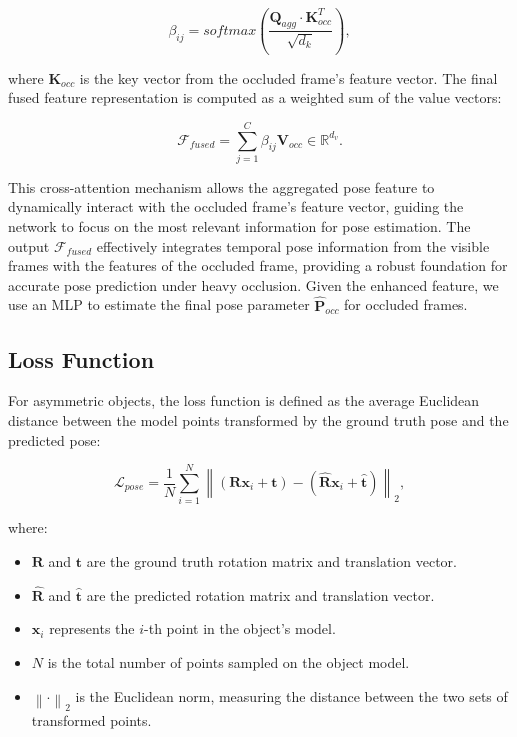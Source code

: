 \begin{equation}
    \beta_{ij} = softmax\left(\frac{\mathbf{Q}_{agg} \cdot \mathbf{K}_{occ}^T}{\sqrt{d_k}}\right),
\end{equation}

\noindent where \( \mathbf{K}_{occ} \) is the key vector from the occluded frame's feature vector. The final fused feature representation is computed as a weighted sum of the value vectors:

\begin{equation}
   \mathcal{F}_{fused} = \sum_{j=1}^{C} \beta_{ij} \mathbf{V}_{occ} \in \mathbb{R}^{d_v}.
\end{equation}

\noindent This cross-attention mechanism allows the aggregated pose feature to dynamically interact with the occluded frame's feature vector, guiding the network to focus on the most relevant information for pose estimation. The output \( \mathcal{F}_{fused} \) effectively integrates temporal pose information from the visible frames with the features of the occluded frame, providing a robust foundation for accurate pose prediction under heavy occlusion. Given the enhanced feature, we use an MLP to estimate the final pose parameter $\hat{\mathbf{P}}_{occ}$ for occluded frames.

\subsection{Loss Function}

For asymmetric objects, the loss function is defined as the average Euclidean distance between the model points transformed by the ground truth pose and the predicted pose:

\begin{equation}
\mathcal{L}_{pose} = \frac{1}{N} \sum_{i=1}^{N} \left\| (\mathbf{R} \mathbf{x}_i + \mathbf{t}) - (\hat{\mathbf{R}} \mathbf{x}_i + \hat{\mathbf{t}}) \right\|_2,
\end{equation}

\noindent where:

\begin{itemize}
    \item $\mathbf{R}$ and $\mathbf{t}$ are the ground truth rotation matrix and translation vector.
    \item $\hat{\mathbf{R}}$ and $\hat{\mathbf{t}}$ are the predicted rotation matrix and translation vector.
    \item $\mathbf{x}_i$ represents the $i$-th point in the object's model.
    \item $N$ is the total number of points sampled on the object model.
    \item $\left\| \cdot \right\|_2$ is the Euclidean norm, measuring the distance between the two sets of transformed points.
\end{itemize}

